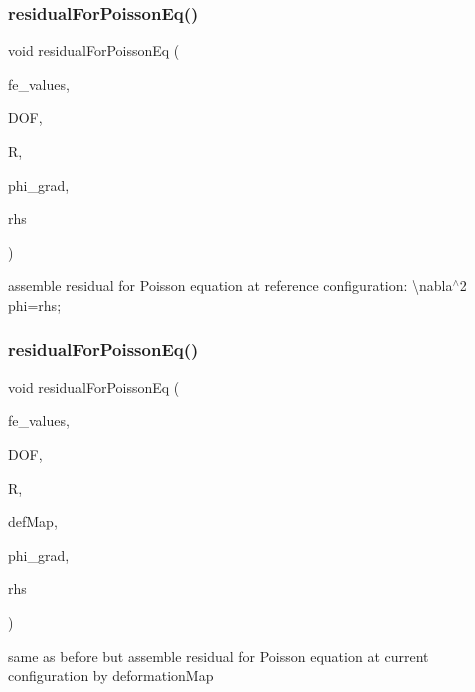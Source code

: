\subsubsection{\texorpdfstring{residualForPoissonEq()}{residualForPoissonEq()}\hspace{0.1cm}{\footnotesize\ttfamily [1/4]}}
{\footnotesize\ttfamily void residual\+For\+Poisson\+Eq (\begin{DoxyParamCaption}\item[{const F\+E\+Values$<$ dim $>$ \&}]{fe\+\_\+values,  }\item[{unsigned int}]{D\+OF,  }\item[{dealii\+::\+Table$<$ 1, T $>$ \&}]{R,  }\item[{dealii\+::\+Table$<$ 2, T $>$ \&}]{phi\+\_\+grad,  }\item[{dealii\+::\+Table$<$ 1, T $>$ \&}]{rhs }\end{DoxyParamCaption})}

assemble residual for Poisson equation at reference configuration\+: \textbackslash{}nabla$^\wedge$2 phi=rhs; \mbox{\label{class_residual_ad457db9bcfe7ff4d134642440cd1c4e6}} 
\subsubsection{\texorpdfstring{residualForPoissonEq()}{residualForPoissonEq()}\hspace{0.1cm}{\footnotesize\ttfamily [2/4]}}
{\footnotesize\ttfamily void residual\+For\+Poisson\+Eq (\begin{DoxyParamCaption}\item[{const F\+E\+Values$<$ dim $>$ \&}]{fe\+\_\+values,  }\item[{unsigned int}]{D\+OF,  }\item[{dealii\+::\+Table$<$ 1, T $>$ \&}]{R,  }\item[{\mbox{\hyperlink{structdeformation_map}{deformation\+Map}}$<$ T, dim $>$ \&}]{def\+Map,  }\item[{dealii\+::\+Table$<$ 2, T $>$ \&}]{phi\+\_\+grad,  }\item[{dealii\+::\+Table$<$ 1, T $>$ \&}]{rhs }\end{DoxyParamCaption})}

same as before but assemble residual for Poisson equation at current configuration by deformation\+Map \mbox{\label{class_residual_ad1d5fc375c6f93d9aad89fc1cf9fd25f}} 
